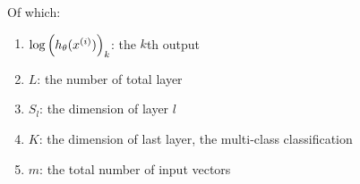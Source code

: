 Of which:
\begin{enumerate}
    \item $\log \left( h_\theta ({x}^{(i)}) \right)_k$: the $k$th output
    \item $L$: the number of total layer
    \item $S_l$: the dimension of layer $l$
    \item $K$: the dimension of last layer, the multi-class classification
    \item $m$: the total number of input vectors
\end{enumerate}











































